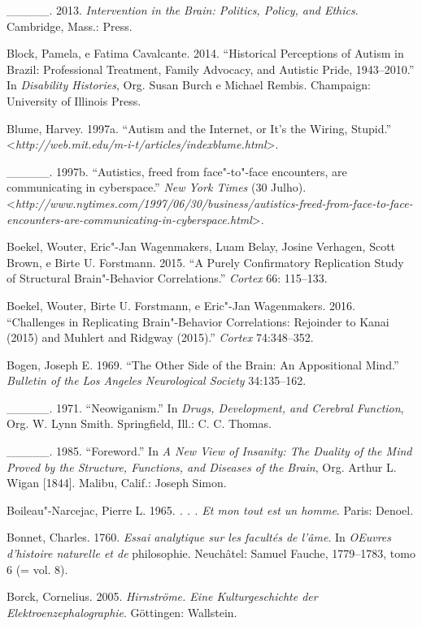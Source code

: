 {\begin{Parskip}
\_\_\_\_\_. 2013. \emph{Intervention in the Brain: Politics, Policy, and
Ethics}. Cambridge, Mass.:  Press.

Block, Pamela, e Fatima Cavalcante. 2014. ``Historical Perceptions of
Autism in Brazil: Professional Treatment, Family Advocacy, and Autistic
Pride, 1943--2010.'' In \emph{Disability Histories}, Org. Susan Burch e
Michael Rembis. Champaign: University of Illinois Press.

Blume, Harvey. 1997a. ``Autism and the Internet, or It's the Wiring,
Stupid.'' \textless{}\emph{http://web.mit.edu/m-i-t/articles/indexblume.html}\textgreater{}.

\_\_\_\_\_. 1997b. ``Autistics, freed from face"-to"-face encounters, are
communicating in cyberspace.'' \emph{New York Times} (30 Julho).
\textless{}\emph{http://www.nytimes.com/1997/06/30/business/autistics-freed-from-face-to-face-encounters-are-communicating-in-cyberspace.html}\textgreater{}.

Boekel, Wouter, Eric"-Jan Wagenmakers, Luam Belay, Josine Verhagen, Scott
Brown, e Birte U. Forstmann. 2015. ``A Purely Confirmatory Replication
Study of Structural Brain"-Behavior Correlations.'' \emph{Cortex} 66:
115--133.

Boekel, Wouter, Birte U. Forstmann, e Eric"-Jan Wagenmakers. 2016.
``Challenges in Replicating Brain"-Behavior Correlations: Rejoinder to
Kanai (2015) and Muhlert and Ridgway (2015).'' \emph{Cortex}
74:348--352.

Bogen, Joseph E. 1969. ``The Other Side of the Brain: An Appositional
Mind.'' \emph{Bulletin of the Los Angeles Neurological Society}
34:135--162.

\_\_\_\_\_. 1971. ``Neowiganism.'' In \emph{Drugs, Development, and
Cerebral Function}, Org. W. Lynn Smith. Springfield, Ill.: C. C. Thomas.

\_\_\_\_\_. 1985. ``Foreword.'' In \emph{A New View of Insanity: The
Duality of the Mind Proved by the Structure, Functions, and Diseases of
the Brain}, Org. Arthur L. Wigan {[}1844{]}. Malibu, Calif.: Joseph
Simon.

Boileau"-Narcejac, Pierre L. 1965. \emph{. . . Et mon tout est un homme}.
Paris: Denoel.

Bonnet, Charles. 1760. \emph{Essai analytique sur les facultés de
l'âme}. In \emph{OEuvres d'histoire naturelle et de} philosophie.
Neuchâtel: Samuel Fauche, 1779--1783, tomo 6 (= vol. 8).

Borck, Cornelius. 2005. \emph{Hirnströme. Eine Kulturgeschichte der
Elektroenzephalographie}. Göttingen: Wallstein.


\end{Parskip}}
